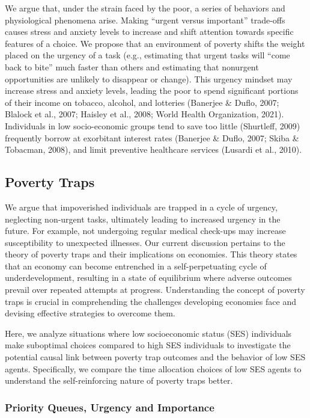 \documentclass[
]{article}
\begin{document}
We argue that, under the strain faced by the poor, a series of behaviors
and physiological phenomena arise. Making ``urgent versus important''
trade-offs causes stress and anxiety levels to increase and shift
attention towards specific features of a choice. We propose that an
environment of poverty shifts the weight placed on the urgency of a task
(e.g., estimating that urgent tasks will ``come back to bite'' much
faster than others and estimating that nonurgent opportunities are
unlikely to disappear or change). This urgency mindset may increase
stress and anxiety levels, leading the poor to spend significant
portions of their income on tobacco, alcohol, and lotteries (Banerjee \&
Duflo, 2007; Blalock et al., 2007; Haisley et al., 2008; World Health
Organization, 2021). Individuals in low socio-economic groups tend to
save too little (Shurtleff, 2009) frequently borrow at exorbitant
interest rates (Banerjee \& Duflo, 2007; Skiba \& Tobacman, 2008), and
limit preventive healthcare services (Lusardi et al., 2010).

\hypertarget{poverty-traps}{%
\subsection{Poverty Traps}\label{poverty-traps}}

We argue that impoverished individuals are trapped in a cycle of
urgency, neglecting non-urgent tasks, ultimately leading to increased
urgency in the future. For example, not undergoing regular medical
check-ups may increase susceptibility to unexpected illnesses. Our
current discussion pertains to the theory of poverty traps and their
implications on economies. This theory states that an economy can become
entrenched in a self-perpetuating cycle of underdevelopment, resulting
in a state of equilibrium where adverse outcomes prevail over repeated
attempts at progress. Understanding the concept of poverty traps is
crucial in comprehending the challenges developing economies face and
devising effective strategies to overcome them.

Here, we analyze situations where low socioeconomic status (SES)
individuals make suboptimal choices compared to high SES individuals to
investigate the potential causal link between poverty trap outcomes and
the behavior of low SES agents. Specifically, we compare the time
allocation choices of low SES agents to understand the self-reinforcing
nature of poverty traps better.

\hypertarget{priority-queues-urgency-and-importance}{%
\subsubsection{Priority Queues, Urgency and
Importance}\label{priority-queues-urgency-and-importance}}
\end{document}

